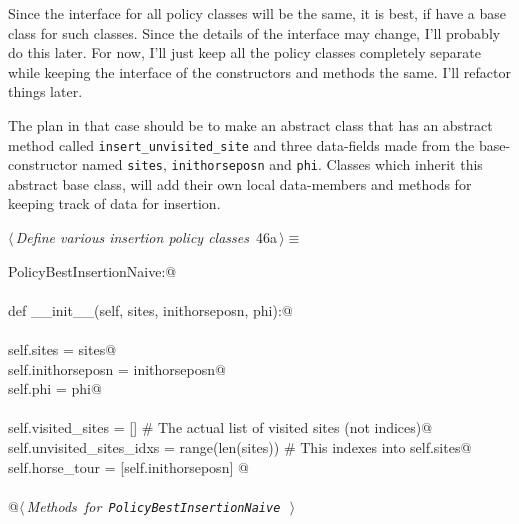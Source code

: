 \documentclass[11.5pt]{report}
\begin{document}
\newchunk Since the interface for all policy classes will be the same, it is 
best, if have a base class for such classes. Since the details of 
the interface may change, I'll probably do this later. For now, 
I'll just keep all the policy classes completely separate while 
keeping the interface of the constructors and methods the same. 
I'll refactor things later. 

The plan in that case should be to make an abstract class that 
has an abstract method called \texttt{insert\_unvisited\_site}
and three data-fields made from the base-constructor named \texttt{sites}, \texttt{inithorseposn}
and \texttt{phi}. Classes which inherit this abstract base class, will 
add their own local data-members and methods for keeping track of 
data for insertion. 

\begin{flushleft} \small\label{scrap66}\raggedright\small
{} $\langle\,${\itshape Define various insertion policy classes}\nobreak\ {\footnotesize {46a}}$\,\rangle\equiv$
\vspace{-1ex}
\begin{list}{}{} \item
\mbox{}\verb@class PolicyBestInsertionNaive:@\\
\mbox{}\verb@@\\
\mbox{}\verb@    def __init__(self, sites, inithorseposn, phi):@\\
\mbox{}\verb@@\\
\mbox{}\verb@         self.sites           = sites@\\
\mbox{}\verb@         self.inithorseposn   = inithorseposn@\\
\mbox{}\verb@         self.phi             = phi@\\
\mbox{}\verb@@\\
\mbox{}\verb@         self.visited_sites        = []                # The actual list of visited sites (not indices)@\\
\mbox{}\verb@         self.unvisited_sites_idxs = range(len(sites)) # This indexes into self.sites@\\
\mbox{}\verb@         self.horse_tour           = [self.inithorseposn]         @\\
\mbox{}\verb@@\\
\mbox{}\verb@    @\hbox{$\langle\,${\itshape Methods for \verb|PolicyBestInsertionNaive|}\nobreak\ {\footnotesize {}}$\,\rangle$}\verb@@\\
\mbox{}\verb@@{\NWsep}
\end{list}

\end{flushleft}
\end{document}
